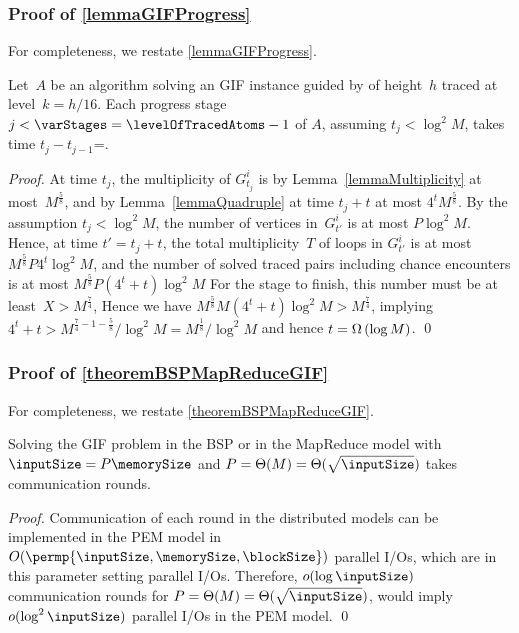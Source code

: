 \documentclass[envcountsame]{llncs}
\def\bO#1{\printmath{\mathcal{O}\left(#1\right)}}
\def\bOm#1{\printmath{\Omega \left(#1\right)}}
\begin{document}
\subsubsection{Proof of \autoref{lemmaGIFProgress}}
For completeness, we restate \autoref{lemmaGIFProgress}.

\begin{lemma}
  Let~$A$ be an algorithm solving an GIF instance \gifInstance guided by \binaryTreeOf{\gifInstance} of height~$h$ traced at level~$k=h/16$.
  Each progress stage $j<\varStages=\levelOfTracedAtoms-1$ of $A$, assuming $t_j<\log^2 M$, takes time $t_j-t_{j-1}$=\bOm{\log M}.
\end{lemma}
\begin{proof}
  At time $t_j$, the multiplicity of $G^i_{t_j}$ is by Lemma~\ref{lemmaMultiplicity} at most~$M^\frac58$, and by Lemma~\ref{lemmaQuadruple} at time $t_j+t$ at most $4^tM^\frac58$.
  By the assumption $t_j<\log^2 M$,  the number of vertices in~$G^i_{t'}$ is at most  $P\log^2M$.
  Hence, at time $t'=t_j+t$, the total multiplicity~$T$ of loops in $G^i_{t'}$ is at most $M^\frac58  P 4^t \log^2M$, and the number of solved traced pairs including chance encounters is at most $M^\frac58  P (4^t + t) \log^2M$
  For the stage to finish, this number must be at least~$X>M^\frac{7}{4}$, 
  Hence we have $M^\frac58  M (4^t+t) \log^2M>M^\frac{7}{4}$, implying $4^t+t > M^{\frac74-1-\frac58}/\log^2M = M^\frac18/\log^2M$ and hence $t=\bOm{\log M}$.
\qed
\end{proof}

\subsubsection{Proof of \autoref{theoremBSPMapReduceGIF}}
For completeness, we restate \autoref{theoremBSPMapReduceGIF}.

\begin{theorem}
\label{theoremBSPMapReduceGIFRestate}
Solving the GIF problem in the BSP or in the MapReduce model with $\inputSize = P\memorySize$ and $P = \Theta(M) = \Theta(\sqrt{\inputSize})$ takes \bOm{\log \inputSize} communication rounds.
\end{theorem}
\begin{proof}
Communication of each round in the distributed models can be implemented in the PEM model in $O(\permp{\inputSize, \memorySize, \blockSize})$ parallel I/Os, which are in this parameter setting \bO{\log P} parallel I/Os. 
Therefore, $o(\log \inputSize)$ communication rounds for $P = \Theta(M) = \Theta(\sqrt{\inputSize})$, would imply $o(\log^2 \inputSize)$ parallel I/Os in the PEM model.  
\qed
\end{proof}
\end{document}
